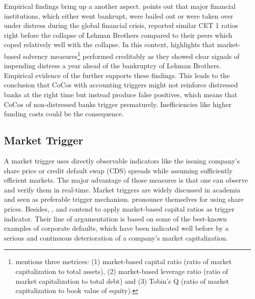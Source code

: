Empirical findings bring up a another aspect. \citet{haldane2011capital} points out that major financial institutions, which either went bankrupt, were bailed out or were taken over under distress during the global financial crisis, reported similar CET 1 ratios right before the collapse of Lehman Brothers compared to their peers which coped relatively well with the collapse. In this context, \citet{haldane2011capital} highlights that market-based solvency measures\footnote{\citet{haldane2011capital} mentions three metrices: (1) market-based capital ratio (ratio of market capitalization to total assets), (2) market-based leverage ratio (ratio of market capitalization to total debt) and (3) Tobin's Q (ratio of market capitalization to book value of equity).} performed creditably as they showed clear signals of impending distress a year ahead of the bankruptcy of Lehman Brothers. Empirical evidence of the  further supports these findings. This leads to the conclusion that CoCos with accounting triggers might not reinforce distressed banks at the right time but instead produce false positives, which means that CoCos of non-distressed banks trigger prematurely. Inefficiencies like higher funding costs could be the consequence. \citep{pazarbasioglu2011contingent}

\subsection{Market Trigger} \label{markettrigger}

A market trigger uses directly observable indicators like the issuing company's share price or credit default swap (CDS) spreads while assuming sufficiently efficient markets. The major advantage of those measures is that one can observe and verify them in real-time. \citep{haldane2011capital} Market triggers are widely discussed in academia and seen as preferable trigger mechanism. \citet{calomiris2013design} pronounce themselves for using share prices. Besides, \citet{haldane2011capital}, \citet{pazarbasioglu2011contingent} and \citep{calomiris2013design} contend to apply market-based capital ratios as trigger indicator. Their line of argumentation is based on some of the best-known examples of corporate defaults, which have been indicated well before by a serious and continuous deterioration of a company's market capitalization.\\ 

